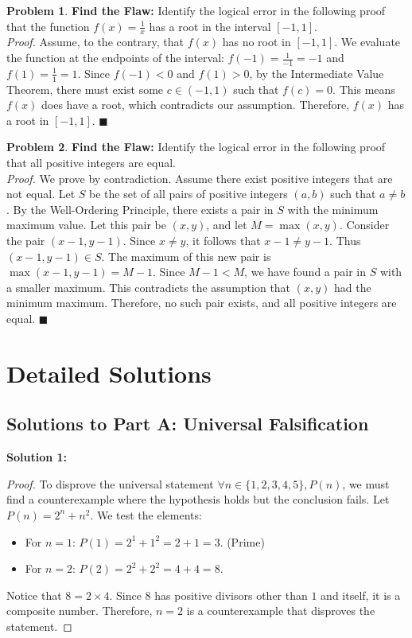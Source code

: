 \documentclass[11pt]{article}
\theoremstyle{definition}
\newtheorem{problem}{Problem}
\begin{document}
\begin{problem}
\textbf{Find the Flaw:} Identify the logical error in the following proof that the function $f(x) = \frac{1}{x}$ has a root in the interval $[-1, 1]$. \\
\textit{Proof.} Assume, to the contrary, that $f(x)$ has no root in $[-1, 1]$. We evaluate the function at the endpoints of the interval: $f(-1) = \frac{1}{-1} = -1$ and $f(1) = \frac{1}{1} = 1$. Since $f(-1) < 0$ and $f(1) > 0$, by the Intermediate Value Theorem, there must exist some $c \in (-1, 1)$ such that $f(c) = 0$. This means $f(x)$ does have a root, which contradicts our assumption. Therefore, $f(x)$ has a root in $[-1, 1]$. $\blacksquare$
\end{problem}

\begin{problem}
\textbf{Find the Flaw:} Identify the logical error in the following proof that all positive integers are equal. \\
\textit{Proof.} We prove by contradiction. Assume there exist positive integers that are not equal. Let $S$ be the set of all pairs of positive integers $(a, b)$ such that $a \neq b$. By the Well-Ordering Principle, there exists a pair in $S$ with the minimum maximum value. Let this pair be $(x, y)$, and let $M = \max(x, y)$. Consider the pair $(x - 1, y - 1)$. Since $x \neq y$, it follows that $x - 1 \neq y - 1$. Thus $(x - 1, y - 1) \in S$. The maximum of this new pair is $\max(x - 1, y - 1) = M - 1$. Since $M - 1 < M$, we have found a pair in $S$ with a smaller maximum. This contradicts the assumption that $(x, y)$ had the minimum maximum. Therefore, no such pair exists, and all positive integers are equal. $\blacksquare$
\end{problem}

\newpage

\section{Detailed Solutions}
\label{sec:solutions}

\subsection*{Solutions to Part A: Universal Falsification}

\textbf{Solution 1:}
\begin{proof}
To disprove the universal statement $\forall n \in \{1, 2, 3, 4, 5\}, P(n)$, we must find a counterexample where the hypothesis holds but the conclusion fails. Let $P(n) = 2^n + n^2$. We test the elements:
\begin{itemize}
    \item For $n = 1$: $P(1) = 2^1 + 1^2 = 2 + 1 = 3$. (Prime)
    \item For $n = 2$: $P(2) = 2^2 + 2^2 = 4 + 4 = 8$.
\end{itemize}
Notice that $8 = 2 \times 4$. Since $8$ has positive divisors other than $1$ and itself, it is a composite number. Therefore, $n = 2$ is a counterexample that disproves the statement.
\end{proof}
\end{document}

